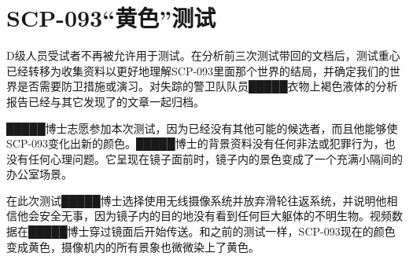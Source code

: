 \section{SCP-093“黄色”测试}

\label{sec:DOC-scp-093-yellow-test}


D级人员受试者不再被允许用于测试。在分析前三次测试带回的文档后，测试重心已经转移为收集资料以更好地理解SCP-093里面那个世界的结局，并确定我们的世界是否需要防卫措施或演习。对失踪的警卫队队员█████衣物上褐色液体的分析报告已经与其它发现了的文章一起归档。

█████博士志愿参加本次测试，因为已经没有其他可能的候选者，而且他能够使SCP-093变化出新的颜色。█████博士的背景资料没有任何非法或犯罪行为，也没有任何心理问题。它呈现在镜子面前时，镜子内的景色变成了一个充满小隔间的办公室场景。

在此次测试█████博士选择使用无线摄像系统并放弃滑轮往返系统，并说明他相信他会安全无事，因为镜子内的目的地没有看到任何巨大躯体的不明生物。视频数据在█████博士穿过镜面后开始传送。和之前的测试一样，SCP-093现在的颜色变成黄色，摄像机内的所有景象也微微染上了黄色。

